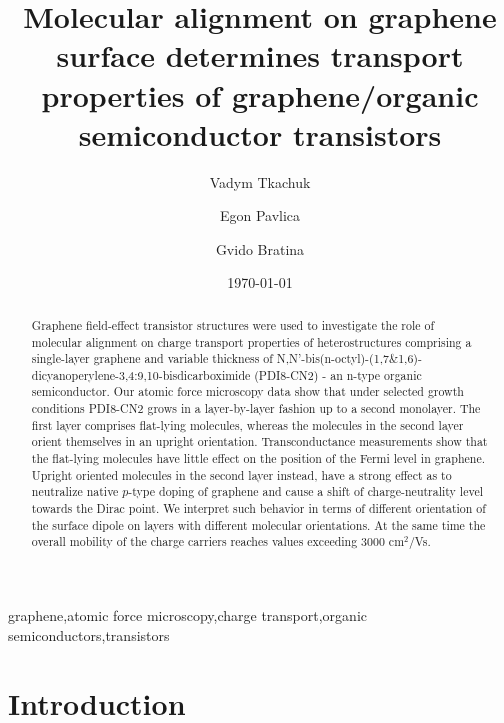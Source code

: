 \documentclass[review]{elsarticle}
\begin{document}
\title{Molecular alignment on graphene surface determines transport properties of graphene/organic semiconductor transistors}

\author{Vadym Tkachuk}%
\author{Egon Pavlica}%
\author{Gvido Bratina}%
\address{Laboratory for Organic matter physics,University of Nova Gorica,\\
  Vipavska 13, SI-5000 Nova Gorica, Slovenia}%
\date{\today}

\begin{abstract}

  Graphene field-effect transistor structures were used to investigate the role of molecular alignment on charge transport properties of heterostructures comprising a single-layer graphene and variable thickness of N,N'-bis(n-octyl)-(1,7\&1,6)-dicyanoperylene-3,4:9,10-bisdicarboximide (PDI8-CN2) - an n-type organic semiconductor.
 Our atomic force microscopy data show that under selected growth conditions PDI8-CN2 grows in a layer-by-layer fashion up to a second monolayer.
 The first layer comprises flat-lying molecules, whereas the molecules in the second layer orient themselves in an upright orientation.
 Transconductance measurements show that the flat-lying molecules have little effect on the position of the Fermi level in graphene.
 Upright oriented molecules in the second layer instead, have a strong effect as to neutralize native $p$-type doping of graphene and cause a shift of charge-neutrality level towards the Dirac point.
 We interpret such behavior in terms of different orientation of the surface dipole on layers with different molecular orientations.
 At the same time the overall mobility of the charge carriers reaches values exceeding 3000 cm$^{2}$/Vs.

  
\end{abstract}
\begin{keyword}

graphene\sep atomic force microscopy\sep charge transport\sep organic semiconductors\sep transistors
\end{keyword}
  


\maketitle

\section{\label{sec:intro}Introduction}
\end{document}
